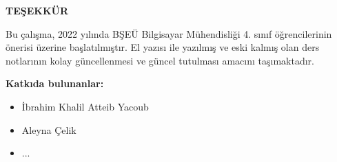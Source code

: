 \begin{center}
    \textbf{TEŞEKKÜR}
\end{center}
Bu çalışma, 2022 yılında BŞEÜ Bilgisayar Mühendisliği 4. sınıf öğrencilerinin önerisi üzerine başlatılmıştır. El yazısı ile yazılmış ve eski kalmış olan ders notlarının kolay güncellenmesi ve güncel tutulması amacını taşımaktadır.

\textbf{Katkıda bulunanlar:}
\begin{itemize}
    \item İbrahim Khalil Atteib Yacoub
    \item Aleyna Çelik
    \item ...
\end{itemize}